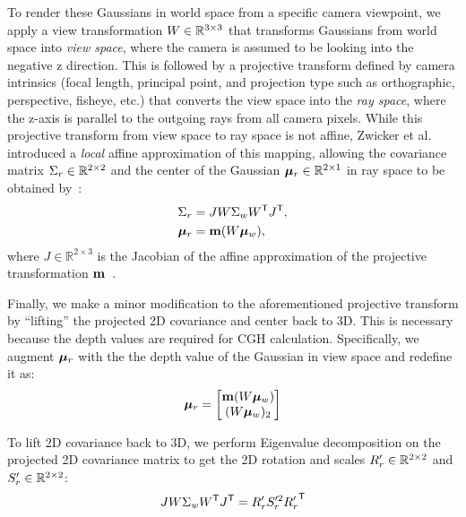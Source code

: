 To render these Gaussians in world space from a specific camera viewpoint, we apply a view transformation $W \in \mathbb{R}^{{3}\times{3}}$ that transforms Gaussians from world space into \textit{view space}, where the camera is assumed to be looking into the negative z direction. This is followed by a projective transform defined by camera intrinsics (focal length, principal point, and projection type such as orthographic, perspective, fisheye, etc.) that converts the view space into the \textit{ray space}, where the z-axis is parallel to the outgoing rays from all camera pixels. While this projective transform from view space to ray space is not affine, Zwicker et al. \cite{zwicker2001ewa} introduced a \textit{local} affine approximation of this mapping, allowing the covariance matrix $\Sigma_r \in \mathbb{R}^{{2}\times{2}}$ and the center of the Gaussian ${\bm{\mu}}_r \in \mathbb{R}^{{2} \times 1}$ in ray space to be obtained by~\cite{kerbl3Dgaussians, zwicker2001ewa}:
\begin{align} 
\Sigma_r &= J W \Sigma_w W^\mathsf{T} J^\mathsf{T}, \\
    {\bm{\mu}}_r &= \mathbf{m}( W {\bm{\mu}}_w), \label{eq:projectivemapping}
\end{align}
where $J \in \mathbb{R}^{2\times3}$ is the Jacobian of the affine approximation of the projective transformation $\mathbf{m}$~\cite{zwicker2001ewa}.

Finally, we make a minor modification to the aforementioned projective transform by ``lifting'' the projected 2D covariance and center back to 3D. This is necessary because the depth values are required for CGH calculation. Specifically, we augment ${\bm{\mu}}_r$ with the the depth value of the Gaussian in view space and redefine it as:
\begin{align}
    {\bm{\mu}}_r = \begin{bmatrix}
        \mathbf{m}( W {\bm{\mu}}_w) \\
        (W {\bm{\mu}}_w)_2
    \end{bmatrix}
\end{align}

To lift 2D covariance back to 3D, we perform Eigenvalue decomposition on the projected 2D covariance matrix to get the 2D rotation and scales $R_r' \in \mathbb{R}^{{2}\times{2}}$ and $S_r' \in \mathbb{R}^{{2}\times{2}}$:
\begin{align}
    J W \Sigma_w W^\mathsf{T} J^\mathsf{T} = R_r' S_r'^2 {R_r'}^\mathsf{T}
\end{align}

